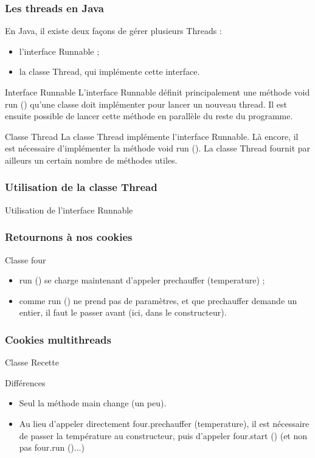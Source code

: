 \documentclass{beamer}
\begin{document}
\begin{frame}
  \frametitle{Les threads en Java}
  En Java, il existe deux façons de gérer plusieurs Threads :
  \begin{itemize}
  \item l'interface Runnable ;
  \item la classe Thread, qui implémente cette interface.
  \end{itemize}
  \begin{block}{Interface Runnable}
  L'interface Runnable définit principalement une méthode
  void run () qu'une classe doit implémenter pour lancer un
  nouveau thread. Il est ensuite possible de lancer cette méthode en
  parallèle du reste du programme.
  \end{block}
  \begin{block}{Classe Thread}
    La classe Thread implémente l'interface
    Runnable. Là encore, il est nécessaire d'implémenter la
    méthode void run (). La classe Thread fournit par
    ailleurs un certain nombre de méthodes utiles.
  \end{block}
\end{frame}

\begin{frame}
  \frametitle{Utilisation de la classe Thread}
    
\end{frame}

\begin{frame}{Utilisation de l'interface Runnable}
  
  
\end{frame}

\begin{frame}
  \frametitle{Retournons à nos cookies}
  Classe four
  
    \begin{itemize}
    \item run () se charge maintenant d'appeler prechauffer
      (temperature) ;
    \item comme run () ne prend pas de paramètres, et que prechauffer
      demande un entier, il faut le passer avant (ici, dans le constructeur).
    \end{itemize}
\end{frame}

\begin{frame}
  \frametitle{Cookies multithreads}
  Classe Recette
  
\begin{block}{Différences}
  \begin{itemize}
  \item Seul la méthode main change (un peu).
  \item Au lieu d'appeler directement four.prechauffer (temperature), il est
  nécessaire de passer la température au constructeur, puis d'appeler
  four.start () (et non pas four.run ()...)
  \end{itemize}

\end{block}
\end{frame}
\end{document}
